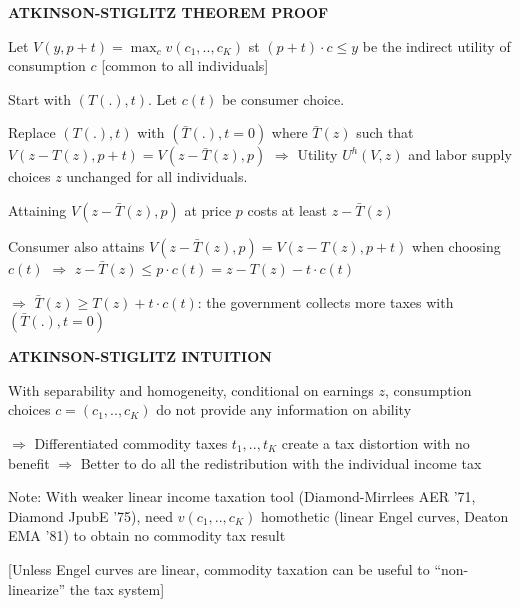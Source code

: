 \documentclass[landscape]{slides}
\begin{document}
\begin{slide}
\begin{center}
{\bf ATKINSON-STIGLITZ THEOREM PROOF}
\end{center}

Let $V(y,p+t)=\max_{c} v(c_1,..,c_K)$ st $(p+t) \cdot c \leq y$ be
the indirect utility of consumption $c$ [common to all
individuals]

Start with $(T(.),t)$. Let $c(t)$ be consumer choice.

Replace $(T(.),t)$ with $(\bar{T}(.),t=0)$ where $\bar{T}(z)$ such
that $V(z-T(z),p+t)=V(z-\bar{T}(z),p)$ $\Rightarrow$ Utility
$U^h(V,z)$ and labor supply choices $z$ unchanged for all
individuals.

Attaining $V(z-\bar{T}(z),p)$ at price $p$ costs at least
$z-\bar{T}(z)$

Consumer also attains $V(z-\bar{T}(z),p)=V(z-T(z),p+t)$ when
choosing $c(t)$ $\Rightarrow$ $ z - \bar{T}(z) \leq p \cdot c(t)
=z -T(z) - t \cdot c(t)$

$\Rightarrow$ $\bar{T}(z) \geq T(z) + t \cdot c(t)$: the
government collects more taxes with $(\bar{T}(.),t=0)$

\end{slide}

\begin{slide}
\begin{center}
{\bf ATKINSON-STIGLITZ INTUITION}
\end{center}

With separability and homogeneity, conditional on earnings $z$,
consumption choices $c=(c_1,..,c_K)$ do not provide any
information on ability

$\Rightarrow$ Differentiated commodity taxes $t_1,..,t_K$ create a
tax distortion with no benefit $\Rightarrow$ Better to do all the
redistribution with the individual income tax

Note: With weaker linear income taxation tool (Diamond-Mirrlees
AER '71, Diamond JpubE '75), need $v(c_1,..,c_K)$ homothetic
(linear Engel curves, Deaton EMA '81) to obtain no
commodity tax result

\small
[Unless Engel curves are linear, commodity taxation can be useful
to ``non-linearize'' the tax system]
\end{slide}
\end{document}

